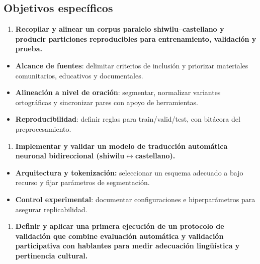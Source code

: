 \documentclass[12pt,a4paper,oneside]{book}
\begin{document}
\subsection{\texorpdfstring{Objetivos específicos }{Objetivos específicos }}\label{objetivos-especuxedficos}

\begin{enumerate}
\def\labelenumi{\arabic{enumi}.}
\item
  \textbf{Recopilar y alinear un corpus paralelo shiwilu--castellano y producir particiones reproducibles para entrenamiento, validación y prueba.}
\end{enumerate}

\begin{itemize}
\item
  \textbf{Alcance de fuentes}: delimitar criterios de inclusión y priorizar materiales comunitarios, educativos y documentales.
\item
  \textbf{Alineación a nivel de oración}: segmentar, normalizar variantes ortográficas y sincronizar pares con apoyo de herramientas.
\item
  \textbf{Reproducibilidad}: definir reglas para train/valid/test, con bitácora del preprocesamiento.
\end{itemize}

\begin{enumerate}
\def\labelenumi{\arabic{enumi}.}
\setcounter{enumi}{1}
\item
  \textbf{Implementar y validar un modelo de traducción automática neuronal bidireccional (shiwilu$\leftrightarrow$castellano).}
\end{enumerate}

\begin{itemize}
\item
  \textbf{Arquitectura y tokenización:} seleccionar un esquema adecuado a bajo recurso y fijar parámetros de segmentación.
\item
  \textbf{Control experimental}: documentar configuraciones e hiperparámetros para asegurar replicabilidad.
\end{itemize}

\begin{enumerate}
\def\labelenumi{\arabic{enumi}.}
\setcounter{enumi}{2}
\item
  \textbf{Definir y aplicar una primera ejecución de un protocolo de validación que combine evaluación automática y validación participativa con hablantes para medir adecuación lingüística y pertinencia cultural.}
\end{enumerate}
\end{document}
